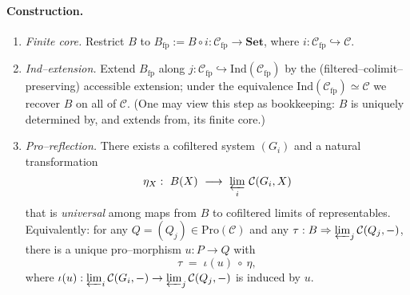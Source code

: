 \documentclass[11pt]{article}
\theoremstyle{upright}
\begin{document}
\begin{infobox}[title={The Stone–Čech of Being}]
\medskip
\paragraph{Construction.}
\begin{enumerate}[leftmargin=2em,label=(\arabic*)]
\item \emph{Finite core.} Restrict $B$ to $B_{\mathrm{fp}}:=B\!\circ\! i:\mathcal C_{\mathrm{fp}}\to\mathbf{Set}$, where $i:\mathcal C_{\mathrm{fp}}\hookrightarrow\mathcal C$.
\item \emph{Ind–extension.} Extend $B_{\mathrm{fp}}$ along $j:\mathcal C_{\mathrm{fp}}\hookrightarrow \mathrm{Ind}(\mathcal C_{\mathrm{fp}})$ by the (filtered–colimit–preserving) accessible extension; under the equivalence $\mathrm{Ind}(\mathcal C_{\mathrm{fp}})\simeq\mathcal C$ we recover $B$ on all of $\mathcal C$. (One may view this step as bookkeeping: $B$ is uniquely determined by, and extends from, its finite core.)
\item \emph{Pro–reflection.} There exists a cofiltered system $(G_i)$ and a natural transformation
\[
\eta_X:\ B(X)\ \longrightarrow\ \varprojlim_{i}\,\mathcal C(G_i,X)
\]
that is \emph{universal} among maps from $B$ to cofiltered limits of representables. Equivalently: for any $Q=(Q_j)\in\mathrm{Pro}(\mathcal C)$ and any $\tau:B\Rightarrow \varprojlim_{j}\mathcal C(Q_j,-)$, there is a unique pro–morphism $u:P\to Q$ with
\[
\tau\;=\;\iota(u)\ \circ\ \eta,
\]
where $\iota(u):\varprojlim_i\mathcal C(G_i,-)\to \varprojlim_j\mathcal C(Q_j,-)$ is induced by $u$.
\end{enumerate}


\end{infobox}
\end{document}
